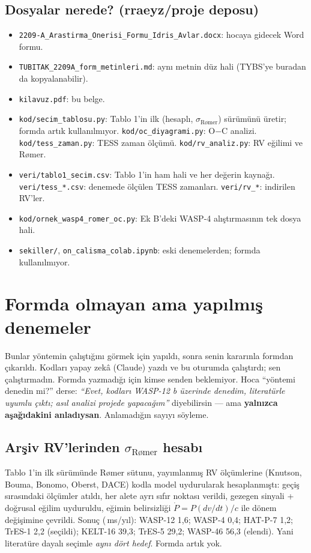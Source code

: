 \documentclass[11pt,a4paper]{article}
\newcommand{\OC}{O$-$C}
\newcommand{\msyil}{\,ms/yıl}
\newcommand{\sR}{\ensuremath{\sigma_{\text{Rømer}}}}
\begin{document}
\subsection{Dosyalar nerede? (rraeyz/proje deposu)}
\begin{itemize}
\item \texttt{2209-A\_Arastirma\_Onerisi\_Formu\_Idris\_Avlar.docx}: hocaya gidecek Word formu.
\item \texttt{TUBITAK\_2209A\_form\_metinleri.md}: aynı metnin düz hali (TYBS'ye buradan da kopyalanabilir).
\item \texttt{kilavuz.pdf}: bu belge.
\item \texttt{kod/secim\_tablosu.py}: Tablo 1'in ilk (hesaplı, \sR) sürümünü üretir; formda artık kullanılmıyor. \texttt{kod/oc\_diyagrami.py}: \OC{} analizi. \texttt{kod/tess\_zaman.py}: TESS zaman ölçümü. \texttt{kod/rv\_analiz.py}: RV eğilimi ve Rømer.
\item \texttt{veri/tablo1\_secim.csv}: Tablo 1'in ham hali ve her değerin kaynağı. \texttt{veri/tess\_*.csv}: denemede ölçülen TESS zamanları. \texttt{veri/rv\_*}: indirilen RV'ler.
\item \texttt{kod/ornek\_wasp4\_romer\_oc.py}: Ek B'deki WASP-4 alıştırmasının tek dosya hali.
\item \texttt{sekiller/}, \texttt{on\_calisma\_colab.ipynb}: eski denemelerden; formda kullanılmıyor.
\end{itemize}

\section{Formda olmayan ama yapılmış denemeler}
\begin{dikkat}
Bunlar yöntemin çalıştığını görmek için yapıldı, sonra senin kararınla formdan çıkarıldı. Kodları yapay zekâ (Claude) yazdı ve bu oturumda çalıştırdı; sen çalıştırmadın. Formda yazmadığı için kimse senden beklemiyor. Hoca ``yöntemi denedin mi?'' derse: \emph{``Evet, kodları WASP-12 b üzerinde denedim, literatürle uyumlu çıktı; asıl analizi projede yapacağım''} diyebilirsin — ama \textbf{yalnızca aşağıdakini anladıysan}. Anlamadığın sayıyı söyleme.
\end{dikkat}

\subsection{Arşiv RV'lerinden \sR{} hesabı}
Tablo 1'in ilk sürümünde Rømer sütunu, yayımlanmış RV ölçümlerine (Knutson, Bouma, Bonomo, Oberst, DACE) kodla model uydurularak hesaplanmıştı: geçiş sırasındaki ölçümler atıldı, her alete ayrı sıfır noktası verildi, gezegen sinyali + doğrusal eğilim uyduruldu, eğimin belirsizliği $\dot P=P(dv/dt)/c$ ile dönem değişimine çevrildi. Sonuç (\msyil): WASP-12 1,6; WASP-4 0,4; HAT-P-7 1,2; TrES-1 2,2 (seçildi); KELT-16 39,3; TrES-5 29,2; WASP-46 56,3 (elendi). Yani literatüre dayalı seçimle \emph{aynı dört hedef}. Formda artık yok.
\end{document}
